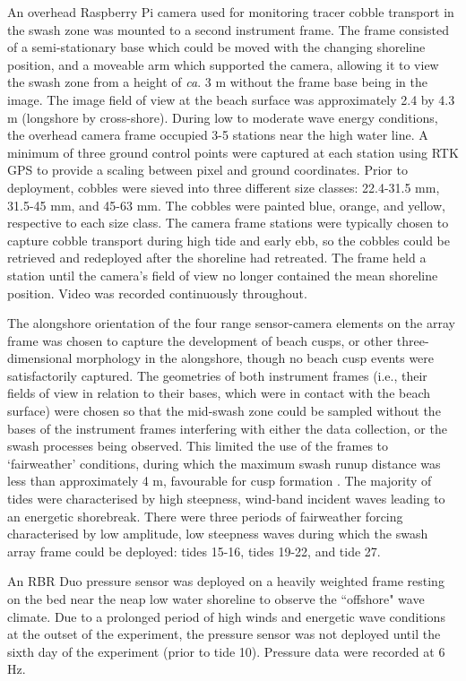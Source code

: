 An overhead Raspberry Pi camera used for monitoring tracer cobble transport in the swash zone was mounted to a second instrument frame. The frame consisted of a semi-stationary base which could be moved with the changing shoreline position, and a moveable arm which supported the camera, allowing it to view the swash zone from a height of \textit{ca}. 3 m without the frame base being in the image. The image field of view at the beach surface was approximately 2.4 by 4.3 m (longshore by cross-shore). During low to moderate wave energy conditions, the overhead camera frame occupied 3-5 stations near the high water line. A minimum of three ground control points were captured at each station using RTK GPS to provide a scaling between pixel and ground coordinates. Prior to deployment, cobbles were sieved into three different size classes: 22.4-31.5 mm, 31.5-45 mm, and 45-63 mm. The cobbles were painted blue, orange, and yellow, respective to each size class. The camera frame stations were typically chosen to capture cobble transport during high tide and early ebb, so the cobbles could be retrieved and redeployed after the shoreline had retreated. The frame held a station until the camera's field of view no longer contained the mean shoreline position. Video was recorded continuously throughout.  

The alongshore orientation of the four range sensor-camera elements on the array frame was chosen to capture the development of beach cusps, or other three-dimensional morphology in the alongshore, though no beach cusp events were satisfactorily captured. The geometries of both instrument frames (i.e., their fields of view in relation to their bases, which were in contact with the beach surface) were chosen so that the mid-swash zone could be sampled without the bases of the instrument frames interfering with either the data collection, or the swash processes being observed. This limited the use of the frames to `fairweather' conditions, during which the maximum swash runup distance was less than approximately 4 m, favourable for cusp formation \citep{Guest_Hay2019}. The majority of tides were characterised by high steepness, wind-band incident waves leading to an energetic shorebreak. There were three periods of fairweather forcing characterised by low amplitude, low steepness waves during which the swash array frame could be deployed: tides 15-16, tides 19-22, and tide 27.

An RBR Duo pressure sensor was deployed on a heavily weighted frame resting on the bed near the neap low water shoreline to observe the ``offshore" wave climate. Due to a prolonged period of high winds and energetic wave conditions at the outset of the experiment, the pressure sensor was not deployed until the sixth day of the experiment (prior to tide 10). Pressure data were recorded at 6 Hz.
